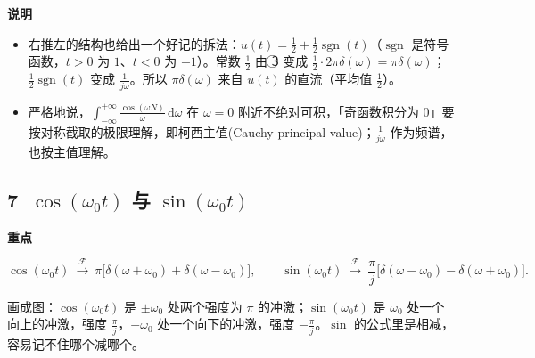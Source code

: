 \documentclass[UTF8,a4paper,11pt]{ctexart}
\newcommand{\dd}{\mathrm{d}}
\newcommand{\F}{\mathcal{F}}
\newenvironment{remember}{\begin{rememberbox}\textbf{重点}\par\smallskip}{\end{rememberbox}}
\newenvironment{note}{\begin{notebox}\textbf{说明}\par\smallskip}{\end{notebox}}
\newcounter{ex}[section]
\begin{document}
\begin{note}
\begin{itemize}[nosep]
\item 右推左的结构也给出一个好记的拆法：$u(t)=\frac12+\frac12\operatorname{sgn}(t)$（$\operatorname{sgn}$ 是符号函数，$t>0$ 为 $1$、$t<0$ 为 $-1$）。常数 $\frac12$ 由 \textcircled{\scriptsize 3} 变成 $\frac12\cdot2\pi\delta(\omega)=\pi\delta(\omega)$；$\frac12\operatorname{sgn}(t)$ 变成 $\frac1{j\omega}$。所以 $\pi\delta(\omega)$ 来自 $u(t)$ 的直流（平均值 $\frac12$）。
\item 严格地说，$\int_{-\infty}^{+\infty}\frac{\cos(\omega N)}{\omega}\,\dd\omega$ 在 $\omega=0$ 附近不绝对可积，「奇函数积分为 $0$」要按对称截取的极限理解，即柯西主值(Cauchy principal value)；$\frac1{j\omega}$ 作为频谱，也按主值理解。
\end{itemize}
\end{note}

\subsection{\texorpdfstring{\textcircled{\scriptsize 7} $\cos(\omega_0t)$ 与 $\sin(\omega_0t)$}{⑦ cos(ω0 t) 与 sin(ω0 t)}}\label{sub:cossin}
\begin{remember}
\[
\cos(\omega_0t)\ \xrightarrow{\ \F\ }\ \pi\big[\delta(\omega+\omega_0)+\delta(\omega-\omega_0)\big],\qquad
\sin(\omega_0t)\ \xrightarrow{\ \F\ }\ \frac\pi j\big[\delta(\omega-\omega_0)-\delta(\omega+\omega_0)\big].
\]
\end{remember}
画成图：$\cos(\omega_0t)$ 是 $\pm\omega_0$ 处两个强度为 $\pi$ 的冲激；$\sin(\omega_0t)$ 是 $\omega_0$ 处一个向上的冲激，强度 $\frac\pi j$，$-\omega_0$ 处一个向下的冲激，强度 $-\frac\pi j$。$\sin$ 的公式里是相减，容易记不住哪个减哪个。
\end{document}
